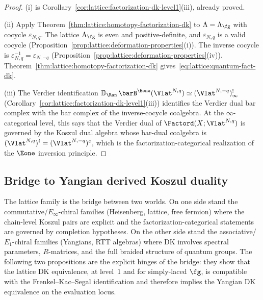 \begin{proof}
(i) is Corollary~\ref{cor:lattice:factorization-dk-level1}(iii),
already proved.

(ii) Apply
Theorem~\ref{thm:lattice:homotopy-factorization-dk} to $\Lambda =
\Lambda_\fg$ with cocycle $\varepsilon_{N,q}$. The lattice
$\Lambda_\fg$ is even and positive-definite, and
$\varepsilon_{N,q}$ is a valid cocycle
(Proposition~\ref{prop:lattice:deformation-properties}(i)). The
inverse cocycle is $\varepsilon_{N,q}^{-1} = \varepsilon_{N,-q}$
(Proposition~\ref{prop:lattice:deformation-properties}(iv)).
Theorem~\ref{thm:lattice:homotopy-factorization-dk}
gives~\eqref{eq:lattice:quantum-fact-dk}.

(iii) The Verdier identification
$\mathbb{D}_{\Ran}\, \barB^{\Eone}(\Vlat^{N,q})
\simeq (\Vlat^{N,-q})^!_\infty$
(Corollary~\ref{cor:lattice:factorization-dk-level1}(iii))
identifies the Verdier dual bar complex with the bar complex of
the inverse-cocycle coalgebra. At the $\infty$-categorical level,
this says
that the Verdier dual of
$\Factord(X; \Vlat^{N,q})$ is governed by the Koszul dual algebra
whose bar-dual coalgebra is
$(\Vlat^{N,q})^i = (\Vlat^{N,-q})^c$, which is the
factorization-categorical realization of the $\Eone$ inversion
principle.
\end{proof}


\subsection{Bridge to Yangian derived Koszul duality}

The lattice family is the bridge between two worlds. On one side
stand the commutative/$E_\infty$-chiral families
(Heisenberg, lattice, free fermion) where the chain-level Koszul pairs
are explicit and the factorization-categorical statements are governed
by completion hypotheses. On the other side stand the associative/$E_1$-chiral
families (Yangians, RTT algebras) where DK involves spectral
parameters, $R$-matrices, and the full braided structure of quantum
groups. The following two propositions are the explicit hinges of
the bridge: they show that the lattice DK equivalence, at level~$1$
and for simply-laced $\fg$, is compatible with the Frenkel--Kac--Segal
identification and therefore implies the Yangian DK equivalence on
the evaluation locus.

